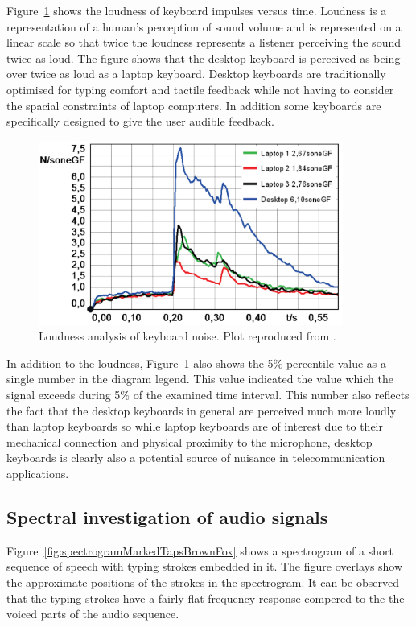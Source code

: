 Figure~\ref{fig:TypingLoudnessKeyboards} shows the loudness of keyboard impulses versus time. Loudness is a representation of a human's perception of sound volume and is represented on a linear scale so that twice the loudness represents a listener perceiving the sound twice as loud. The figure shows that the desktop keyboard is perceived as being over twice as loud as a laptop keyboard. Desktop keyboards are traditionally optimised for typing comfort and tactile feedback while not having to consider the spacial constraints of laptop computers. In addition some keyboards are specifically designed to give the user audible feedback\cite{Hauswirth2013}.

\begin{figure}[!] %
\centering
\includegraphics[width=100mm]{TypingLoudnessKeyboards.png}
\caption{Loudness analysis of keyboard noise. Plot reproduced from \cite{Hauswirth2013}.}\label{fig:TypingLoudnessKeyboards}
\end{figure}

In addition to the loudness, Figure~\ref{fig:TypingLoudnessKeyboards} also shows the 5\% percentile value as a single number in the diagram legend. This value indicated the value which the signal exceeds during 5\% of the examined time interval\cite{Hauswirth2013}. This number also reflects the fact that the desktop keyboards in general are perceived much more loudly than laptop keyboards so while laptop keyboards are of interest due to their mechanical connection and physical proximity to the microphone, desktop keyboards is clearly also a potential source of nuisance in telecommunication applications.

\subsection{Spectral investigation of audio signals}
Figure~\ref{fig:spectrogramMarkedTapsBrownFox} shows a spectrogram of a short sequence of speech with typing strokes embedded in it. The figure overlays show the approximate positions of the strokes in the spectrogram. It can be observed that the typing strokes have a fairly flat frequency response compered to the the voiced parts of the audio sequence.

